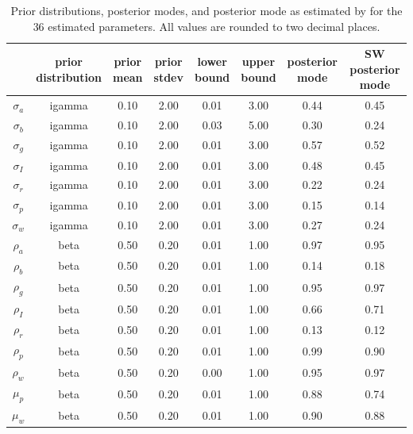 \documentclass[11pt]{article}
\begin{document}
\begin{table}

\caption{\label{tab:parameter-estimate-table}Prior distributions, posterior modes, and posterior mode as
      estimated by \citep{SmetsWouters2007} for the 36 estimated
      parameters. All values are rounded to two decimal places.}
\centering
\fontsize{9}{11}\selectfont
\begin{tabular}[t]{cccccccc}
\toprule
 & \makecell[c]{prior\\distribution} & \makecell[c]{prior\\mean} & \makecell[c]{prior\\stdev} & \makecell[c]{lower\\bound} & \makecell[c]{upper\\bound} & \makecell[c]{posterior\\mode} & \makecell[c]{SW posterior\\mode}\\
\midrule
$\sigma_a$ & igamma & 0.10 & 2.00 & 0.01 & 3.00 & 0.44 & 0.45\\
$\sigma_b$ & igamma & 0.10 & 2.00 & 0.03 & 5.00 & 0.30 & 0.24\\
$\sigma_g$ & igamma & 0.10 & 2.00 & 0.01 & 3.00 & 0.57 & 0.52\\
$\sigma_I$ & igamma & 0.10 & 2.00 & 0.01 & 3.00 & 0.48 & 0.45\\
$\sigma_r$ & igamma & 0.10 & 2.00 & 0.01 & 3.00 & 0.22 & 0.24\\
\addlinespace
$\sigma_p$ & igamma & 0.10 & 2.00 & 0.01 & 3.00 & 0.15 & 0.14\\
$\sigma_w$ & igamma & 0.10 & 2.00 & 0.01 & 3.00 & 0.27 & 0.24\\
$\rho_a$ & beta & 0.50 & 0.20 & 0.01 & 1.00 & 0.97 & 0.95\\
$\rho_b$ & beta & 0.50 & 0.20 & 0.01 & 1.00 & 0.14 & 0.18\\
$\rho_g$ & beta & 0.50 & 0.20 & 0.01 & 1.00 & 0.95 & 0.97\\
\addlinespace
$\rho_I$ & beta & 0.50 & 0.20 & 0.01 & 1.00 & 0.66 & 0.71\\
$\rho_r$ & beta & 0.50 & 0.20 & 0.01 & 1.00 & 0.13 & 0.12\\
$\rho_p$ & beta & 0.50 & 0.20 & 0.01 & 1.00 & 0.99 & 0.90\\
$\rho_w$ & beta & 0.50 & 0.20 & 0.00 & 1.00 & 0.95 & 0.97\\
$\mu_p$ & beta & 0.50 & 0.20 & 0.01 & 1.00 & 0.88 & 0.74\\
\addlinespace
$\mu_w$ & beta & 0.50 & 0.20 & 0.01 & 1.00 & 0.90 & 0.88\\

\end{tabular}
\end{table}
\end{document}
